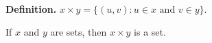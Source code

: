 \textbf{Definition.} $x \times y = \{(u,v) : u \in x \text{ and } v \in y\}$.

If $x$ and $y$ are sets, then $x \times y$ is a set.
